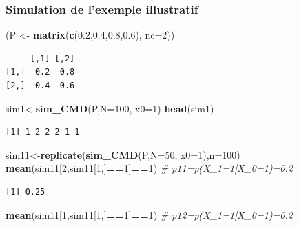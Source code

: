 \documentclass[
]{book}
\newenvironment{Shaded}{\begin{snugshade}}{\end{snugshade}}
\newcommand{\CommentTok}[1]{\textcolor[rgb]{0.56,0.35,0.01}{\textit{#1}}}
\newcommand{\DataTypeTok}[1]{\textcolor[rgb]{0.13,0.29,0.53}{#1}}
\newcommand{\DecValTok}[1]{\textcolor[rgb]{0.00,0.00,0.81}{#1}}
\newcommand{\FloatTok}[1]{\textcolor[rgb]{0.00,0.00,0.81}{#1}}
\newcommand{\KeywordTok}[1]{\textcolor[rgb]{0.13,0.29,0.53}{\textbf{#1}}}
\newcommand{\NormalTok}[1]{#1}
\newcommand{\OperatorTok}[1]{\textcolor[rgb]{0.81,0.36,0.00}{\textbf{#1}}}
\newcommand{\StringTok}[1]{\textcolor[rgb]{0.31,0.60,0.02}{#1}}
\theoremstyle{definition}
\theoremstyle{definition}
\theoremstyle{definition}
\theoremstyle{remark}
\begin{document}
\hypertarget{simulation-de-lexemple-illustratif}{%
\subsubsection{Simulation de l'exemple illustratif}\label{simulation-de-lexemple-illustratif}}

\begin{Shaded}
\begin{Highlighting}[]
\NormalTok{(P <-}\StringTok{ }\KeywordTok{matrix}\NormalTok{(}\KeywordTok{c}\NormalTok{(}\FloatTok{0.2}\NormalTok{,}\FloatTok{0.4}\NormalTok{,}\FloatTok{0.8}\NormalTok{,}\FloatTok{0.6}\NormalTok{), }\DataTypeTok{nc=}\DecValTok{2}\NormalTok{))}
\end{Highlighting}
\end{Shaded}

\begin{verbatim}
     [,1] [,2]
[1,]  0.2  0.8
[2,]  0.4  0.6
\end{verbatim}

\begin{Shaded}
\begin{Highlighting}[]
\NormalTok{sim1<-}\KeywordTok{sim_CMD}\NormalTok{(P,}\DataTypeTok{N=}\DecValTok{100}\NormalTok{, }\DataTypeTok{x0=}\DecValTok{1}\NormalTok{)}
\KeywordTok{head}\NormalTok{(sim1)}
\end{Highlighting}
\end{Shaded}

\begin{verbatim}
[1] 1 2 2 2 1 1
\end{verbatim}

\begin{Shaded}
\begin{Highlighting}[]
\NormalTok{sim11<-}\KeywordTok{replicate}\NormalTok{(}\KeywordTok{sim_CMD}\NormalTok{(P,}\DataTypeTok{N=}\DecValTok{50}\NormalTok{, }\DataTypeTok{x0=}\DecValTok{1}\NormalTok{),}\DataTypeTok{n=}\DecValTok{100}\NormalTok{)}
\KeywordTok{mean}\NormalTok{(sim11[}\DecValTok{2}\NormalTok{,sim11[}\DecValTok{1}\NormalTok{,]}\OperatorTok{==}\DecValTok{1}\NormalTok{]}\OperatorTok{==}\DecValTok{1}\NormalTok{) }\CommentTok{# p11=p(X_1=1|X_0=1)=0.2}
\end{Highlighting}
\end{Shaded}

\begin{verbatim}
[1] 0.25
\end{verbatim}

\begin{Shaded}
\begin{Highlighting}[]
\KeywordTok{mean}\NormalTok{(sim11[}\DecValTok{1}\NormalTok{,sim11[}\DecValTok{1}\NormalTok{,]}\OperatorTok{==}\DecValTok{1}\NormalTok{]}\OperatorTok{==}\DecValTok{1}\NormalTok{) }\CommentTok{# p12=p(X_1=1|X_0=1)=0.2}
\end{Highlighting}
\end{Shaded}
\end{document}
